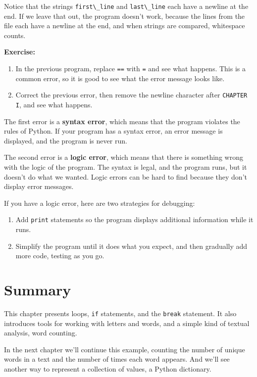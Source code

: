 Notice that the strings \passthrough{\lstinline!first\_line!} and
\passthrough{\lstinline!last\_line!} each have a newline at the end. If
we leave that out, the program doesn't work, because the lines from the
file each have a newline at the end, and when strings are compared,
whitespace counts.

\textbf{Exercise:}

\begin{enumerate}
\def\labelenumi{\arabic{enumi}.}
\item
  In the previous program, replace \passthrough{\lstinline!==!} with
  \passthrough{\lstinline!=!} and see what happens. This is a common
  error, so it is good to see what the error message looks like.
\item
  Correct the previous error, then remove the newline character after
  \passthrough{\lstinline!CHAPTER I!}, and see what happens.
\end{enumerate}

The first error is a \textbf{syntax error}, which means that the program
violates the rules of Python. If your program has a syntax error, an
error message is displayed, and the program is never run.

The second error is a \textbf{logic error}, which means that there is
something wrong with the logic of the program. The syntax is legal, and
the program runs, but it doesn't do what we wanted. Logic errors can be
hard to find because they don't display error messages.

If you have a logic error, here are two strategies for debugging:

\begin{enumerate}
\def\labelenumi{\arabic{enumi}.}
\item
  Add \passthrough{\lstinline!print!} statements so the program displays
  additional information while it runs.
\item
  Simplify the program until it does what you expect, and then gradually
  add more code, testing as you go.
\end{enumerate}

\hypertarget{summary}{%
\section{Summary}\label{summary}}

This chapter presents loops, \passthrough{\lstinline!if!} statements,
and the \passthrough{\lstinline!break!} statement. It also introduces
tools for working with letters and words, and a simple kind of textual
analysis, word counting.

In the next chapter we'll continue this example, counting the number of
unique words in a text and the number of times each word appears. And
we'll see another way to represent a collection of values, a Python
dictionary.


